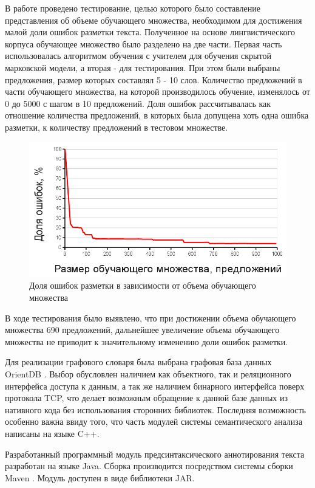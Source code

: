 В работе проведено тестирование, целью которого было составление представления об объеме обучающего множества, необходимом для достижения малой доли ошибок разметки текста. Полученное на основе лингвистического корпуса обучающее множество было разделено на две части. Первая часть использовалась алгоритмом обучения с учителем для обучения скрытой марковской модели, а вторая - для тестирования. При этом были выбраны предложения, размер которых составлял 5 - 10 слов. Количество предложений в части обучающего множества, на которой производилось обучение, изменялось от 0 до 5000 с шагом в 10 предложений. Доля ошибок рассчитывалась как отношение количества предложений, в которых была допущена хоть одна ошибка разметки, к количеству предложений в тестовом множестве.
\begin{figure}[H]
	\centering
	\includegraphics[scale=0.5]{img/test_chart.png}
	\caption{Доля ошибок разметки в зависимости от объема обучающего множества}
\end{figure}
В ходе тестирования было выявлено, что при достижении объема обучающего множества 690 предложений, дальнейшее увеличение объема обучающего множества не приводит к значительному изменению доли ошибок разметки.

Для реализации графового словаря была выбрана графовая база данных OrientDB \cite{web.orient}. Выбор обусловлен наличием как объектного, так и реляционного интерфейса доступа к данным, а так же наличием бинарного интерфейса поверх протокола TCP, что делает возможным обращение к данной базе данных из нативного кода без использования сторонних библиотек. Последняя возможность особенно важна ввиду того, что часть модулей системы семантического анализа написаны на языке C++.

Разработанный программный модуль предсинтаксического аннотирования текста разработан на языке Java. Сборка производится посредством системы сборки Maven \cite{maven}. Модуль доступен в виде библиотеки JAR.

